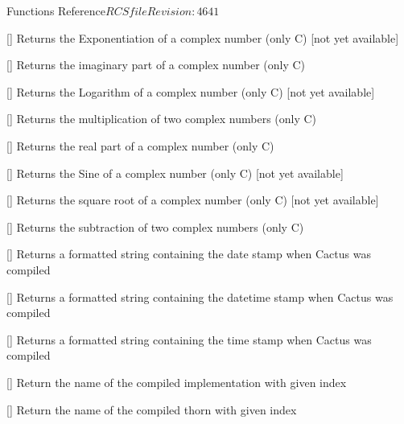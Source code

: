 \begin{cactuspart}{ Functions Reference}{$RCSfile$}{$Revision: 4641 $}
\begin{Lentry}
\item[\code{CCTK\_CmplxExp}] [\pageref{CCTK-CmplxExp}]
  Returns the Exponentiation of a complex number (only C) [not yet available]

\item[\code{CCTK\_CmplxImag}] [\pageref{CCTK-CmplxImag}]
  Returns the imaginary part of a complex number (only C)

\item[\code{CCTK\_CmplxLog}] [\pageref{CCTK-CmplxLog}]
  Returns the Logarithm of a complex number (only C) [not yet available]

\item[\code{CCTK\_CmplxMul}] [\pageref{CCTK-CmplxMul}]
  Returns the multiplication of two complex numbers (only C)

\item[\code{CCTK\_CmplxReal}] [\pageref{CCTK-CmplxReal}]
  Returns the real part of a complex number (only C)

\item[\code{CCTK\_CmplxSin}] [\pageref{CCTK-CmplxSin}]
  Returns the Sine of a complex number (only C) [not yet available]

\item[\code{CCTK\_CmplxSqrt}] [\pageref{CCTK-CmplxSqrt}]
  Returns the square root of a complex number (only C) [not yet available]

\item[\code{CCTK\_CmplxSub}] [\pageref{CCTK-CmplxSub}]
  Returns the subtraction of two complex numbers (only C)

\item[\code{CCTK\_CompileDate}] [\pageref{CCTK-CompileDate}]
  Returns a formatted string containing the date stamp when Cactus was compiled

\item[\code{CCTK\_CompileDateTime}] [\pageref{CCTK-CompileDateTime}]
  Returns a formatted string containing the datetime stamp when Cactus was compiled

\item[\code{CCTK\_CompileTime}] [\pageref{CCTK-CompileTime}]
  Returns a formatted string containing the time stamp when Cactus was compiled

\item[\code{CCTK\_CompiledImplementation}]
  [\pageref{CCTK-CompiledImplementation}]
  Return the name of the compiled implementation with given index

\item[\code{CCTK\_CompiledThorn}] [\pageref{CCTK-CompiledThorn}]
  Return the name of the compiled thorn with given index


\end{Lentry}
\end{cactuspart}
